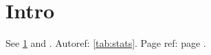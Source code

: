 \documentclass{article}
\begin{document}
\section{Intro}\label{sec:intro}
See \cref{sec:intro} and .
Autoref: \autoref{tab:stats}.
Page ref: page \pageref{sec:intro}.
\end{document}

